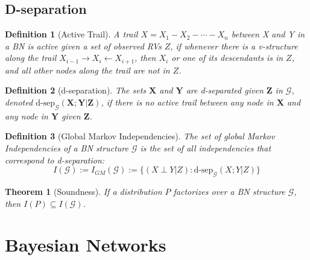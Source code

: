 \documentclass[11pt]{article}
\numberwithin{equation}{section}
\theoremstyle{boldStyle}
\theoremstyle{boldBlueStyle}
\theoremstyle{boldPurpleStyle}
\newtheorem{theorem}{Theorem}[section]
\theoremstyle{boldRedStyle}
\newtheorem{definition}{Definition}[section]
\begin{document}
\subsection{D-separation}

\begin{definition}[Active Trail]
    A trail $X = X_1 - X_2 - \cdots - X_n$ between X and Y in a BN is active given a set of observed RVs $Z$,
    if whenever there is a v-structure along the trail $X_{i-1} \rightarrow X_{i} \leftarrow X_{i+1}$, then $X_{i}$ or one of its descendants is in $Z$, 
    and all other nodes along the trail are not in $Z$.
\end{definition}

\begin{definition}[d-separation]
    The sets $\textbf{X}$ and $\textbf{Y}$ are d-separated given $\textbf{Z}$ in $\mathcal{G}$, denoted $\text{d-sep}_{\mathcal{G}}(\textbf{X};\textbf{Y} | \textbf{Z})$,
    if there is no active trail between any node in $\textbf{X}$ and any node in $\textbf{Y}$ given $\textbf{Z}$.
\end{definition}

\begin{definition}[Global Markov Independencies]
    The set of global Markov Independencies of a BN structure $\mathcal{G}$ is the set of all independencies that correspond to d-separation:
    \begin{equation*}
        I(\mathcal{G}) := I_{GM}(\mathcal{G}) := \{ (X \perp Y | Z) : \text{d-sep}_{\mathcal{G}}(X;Y | Z) \}
    \end{equation*}
\end{definition}

\begin{theorem}[Soundness]
    If a distribution $P$ factorizes over a BN structure $\mathcal{G}$, then $I(P) \subseteq I(\mathcal{G})$.
\end{theorem}




\newpage
\section{Bayesian Networks}
\end{document}
